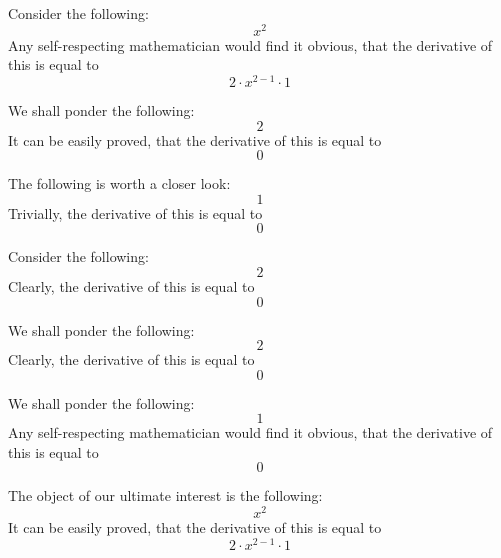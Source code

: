 \documentclass{article}
\begin{document}
Consider the following:
\begin{equation}
x ^{2 } 
\end{equation}
Any self-respecting mathematician would find it obvious, that the derivative of this is equal to
\begin{equation}
2 \cdot x ^{2 - 1 } \cdot 1 
\end{equation}

We shall ponder the following:
\begin{equation}
2 
\end{equation}
It can be easily proved, that the derivative of this is equal to
\begin{equation}
0 
\end{equation}

The following is worth a closer look:
\begin{equation}
1 
\end{equation}
Trivially, the derivative of this is equal to
\begin{equation}
0 
\end{equation}

Consider the following:
\begin{equation}
2 
\end{equation}
Clearly, the derivative of this is equal to
\begin{equation}
0 
\end{equation}

We shall ponder the following:
\begin{equation}
2 
\end{equation}
Clearly, the derivative of this is equal to
\begin{equation}
0 
\end{equation}

We shall ponder the following:
\begin{equation}
1 
\end{equation}
Any self-respecting mathematician would find it obvious, that the derivative of this is equal to
\begin{equation}
0 
\end{equation}

The object of our ultimate interest is the following:
\begin{equation}
x ^{2 } 
\end{equation}
It can be easily proved, that the derivative of this is equal to
\begin{equation}
2 \cdot x ^{2 - 1 } \cdot 1 
\end{equation}
\end{document}
